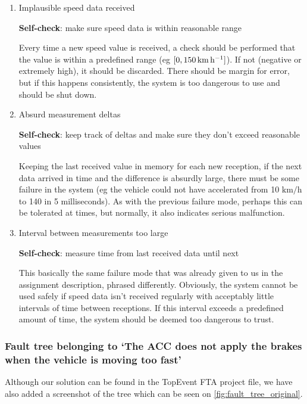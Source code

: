 \documentclass[a4paper]{article}
\begin{document}
\begin{enumerate}
	\item Implausible speed data received

		\textbf{Self-check}: make sure speed data is within reasonable
		range

		Every time a new speed value is received, a check should be
		performed that the value is within a predefined range (eg
		\(\interval{0}{\SI{150}{\km\per\hour}}\)). If not
		(negative or extremely high), it should be discarded. There
		should be margin for error, but if this happens consistently,
		the system is too dangerous to use and should be shut down.

	\item Absurd measurement deltas

		\textbf{Self-check}: keep track of deltas and make sure they
		don't exceed reasonable values

		Keeping the last received value in memory for each new
		reception, if the next data arrived in time and the difference
		is absurdly large, there must be some failure in the system (eg
		the vehicle could not have accelerated from 10
		\(\si{\km\per\hour}\) to 140 in 5 milliseconds). As with
		the previous failure mode, perhaps this can be tolerated at
		times, but normally, it also indicates serious malfunction.

	\item Interval between measurements too large

		\textbf{Self-check}: measure time from last received data until
		next

		This basically the same failure mode that was already given to
		us in the assignment description, phrased differently.
		Obviously, the system cannot be used safely if speed data isn't
		received regularly with acceptably little intervals of time
		between receptions. If this interval exceeds a predefined amount
		of time, the system should be deemed too dangerous to trust.
\end{enumerate}

\subsubsection{Fault tree belonging to ‘The ACC does not apply the brakes when
               the vehicle is moving too fast’}

Although our solution can be found in the TopEvent FTA project file, we have
also added a screenshot of the tree which can be seen on
\cref{fig:fault_tree_original}.
\end{document}
